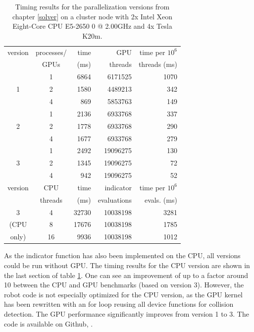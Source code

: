 \documentclass[twocolumn]{svjour3}
\begin{document}
\begin{table}
\caption{Timing results for the parallelization versions from chapter \ref{solver} on a cluster node with 2x Intel Xeon Eight-Core CPU E5-2650 0 @ 2.00GHz and 4x Tesla K20m.}\label{resulttable}
\centering

\begin{tabular}{ c  c  r  r  r }

\hline
version	&  processes/	& time		& GPU 		& time per $10^6$  \\ 
		& GPUs		& (ms)		& threads		& threads (ms) \\ 
\hline
		& 1			& 6864		& 6171525	& 1070	\\ 
1		& 2			& 1580		& 4489213	& 342	\\ 
		& 4			& 869		& 5853763	& 149	\\ 
\hline
		& 1			& 2136		& 6933768	& 337	\\ 
2		& 2			& 1778		& 6933768	& 290	\\ 
		& 4			& 1677		& 6933768	& 279	\\ 
\hline
		& 1			& 2492		& 19096275	& 130	\\ 
3		& 2			& 1345		& 19096275	& 72		\\ 
		& 4			& 942		& 19096275	& 52		\\ 
\hline
\hline
version	&  CPU		& time		& indicator 	& time per $10^6$  \\ 
		& threads		& (ms)		& evaluations	& evals. (ms) \\
		
\hline
3		& 4			& 32730		& 10038198	& 3281	\\ 
 (CPU	& 8			& 17676		& 10038198	& 1785	\\ 
only)		& 16			& 9936		& 10038198	& 1012	\\ 
\hline

\end{tabular}
\end{table}


As the indicator function has also been implemented on the CPU, all versions could be run without GPU.
The timing results for the CPU version are shown in the last section of table \ref{resulttable}.
One can see an improvement of up to a factor around 10 between the CPU and GPU benchmarks (based on version 3).
However, the robot code is not especially optimized for the CPU version, as the GPU kernel has been rewritten with an for loop
reusing all device functions for collision detection.
The GPU performance significantly improves from version 1 to 3.
The code is available on Github, \cite{githubcode}.
\end{document}
